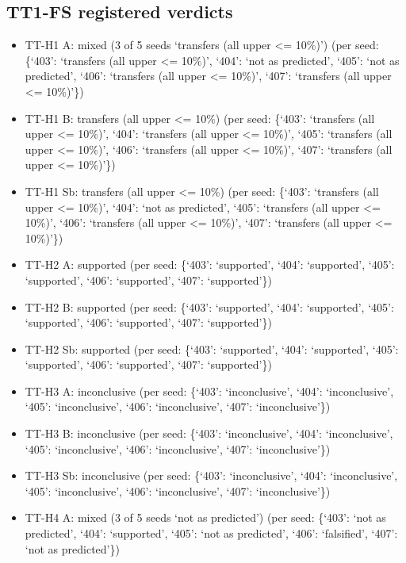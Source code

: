 \documentclass[10pt,twocolumn,letterpaper]{article}
\providecommand{\tightlist}{\setlength{\itemsep}{0pt}\setlength{\parskip}{0pt}}
\begin{document}
\subsection{TT1-FS registered verdicts}\label{tt1-fs-registered-verdicts}

\begin{itemize}
\tightlist
\item
  TT-H1 A: mixed (3 of 5 seeds `transfers (all upper \textless= 10\%)') (per seed: \{`403': `transfers (all upper \textless= 10\%)', `404': `not as predicted', `405': `not as predicted', `406': `transfers (all upper \textless= 10\%)', `407': `transfers (all upper \textless= 10\%)'\})
\item
  TT-H1 B: transfers (all upper \textless= 10\%) (per seed: \{`403': `transfers (all upper \textless= 10\%)', `404': `transfers (all upper \textless= 10\%)', `405': `transfers (all upper \textless= 10\%)', `406': `transfers (all upper \textless= 10\%)', `407': `transfers (all upper \textless= 10\%)'\})
\item
  TT-H1 Sb: transfers (all upper \textless= 10\%) (per seed: \{`403': `transfers (all upper \textless= 10\%)', `404': `not as predicted', `405': `transfers (all upper \textless= 10\%)', `406': `transfers (all upper \textless= 10\%)', `407': `transfers (all upper \textless= 10\%)'\})
\item
  TT-H2 A: supported (per seed: \{`403': `supported', `404': `supported', `405': `supported', `406': `supported', `407': `supported'\})
\item
  TT-H2 B: supported (per seed: \{`403': `supported', `404': `supported', `405': `supported', `406': `supported', `407': `supported'\})
\item
  TT-H2 Sb: supported (per seed: \{`403': `supported', `404': `supported', `405': `supported', `406': `supported', `407': `supported'\})
\item
  TT-H3 A: inconclusive (per seed: \{`403': `inconclusive', `404': `inconclusive', `405': `inconclusive', `406': `inconclusive', `407': `inconclusive'\})
\item
  TT-H3 B: inconclusive (per seed: \{`403': `inconclusive', `404': `inconclusive', `405': `inconclusive', `406': `inconclusive', `407': `inconclusive'\})
\item
  TT-H3 Sb: inconclusive (per seed: \{`403': `inconclusive', `404': `inconclusive', `405': `inconclusive', `406': `inconclusive', `407': `inconclusive'\})
\item
  TT-H4 A: mixed (3 of 5 seeds `not as predicted') (per seed: \{`403': `not as predicted', `404': `supported', `405': `not as predicted', `406': `falsified', `407': `not as predicted'\})

\end{itemize}
\end{document}
